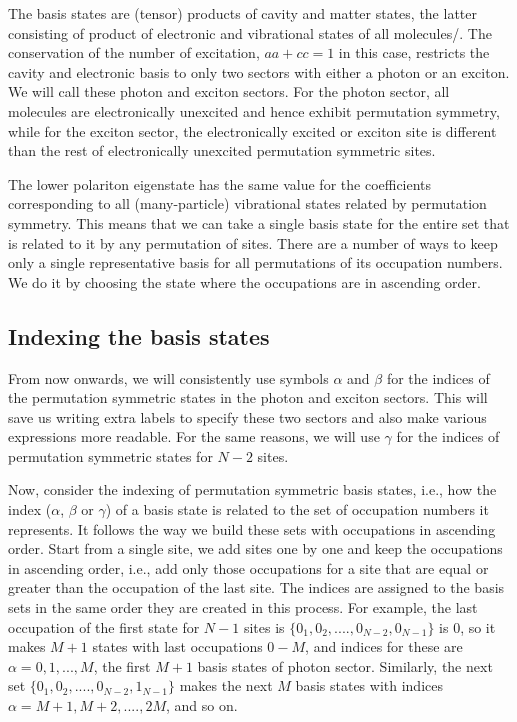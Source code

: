 \documentclass[final,twocolumn]{elsarticle}
\newcommand{\az}[1]{{\color{magenta}{#1}}}
\begin{document}
\begin{small}
The basis states are (tensor) products of cavity and matter states, the latter consisting of product of electronic and vibrational states of all molecules/\az{sites}. 
The conservation of the number of excitation,
$aa+cc=1$ in this case,
restricts the cavity and electronic basis to only two sectors with either a photon or an exciton. 
We will call these photon and exciton sectors.
For the photon sector, all molecules are electronically unexcited and hence exhibit permutation symmetry,
while for the exciton sector, the electronically excited or exciton site is different 
than the rest of electronically unexcited permutation symmetric sites.

The lower polariton eigenstate has the same value for the coefficients corresponding to all (many-particle) vibrational states related by permutation symmetry.
This means that we can take a single basis state for the entire set that is related to it by any permutation of sites.
There are a number of ways to keep only a single representative basis for all permutations of its occupation numbers.
We do it by
choosing the state where the occupations are in ascending order.
\subsection{Indexing the basis states}
From now onwards, 
we will consistently use symbols $\alpha$ and $\beta$ for the indices of the permutation symmetric states in the photon and exciton sectors. This will save us writing extra labels to specify these two sectors and also make various expressions more readable. 
For the same reasons, we will use $\gamma$ for the indices of permutation symmetric states for $N-2$ sites.

Now, consider the indexing of permutation symmetric basis states, i.e., how the index ($\alpha$, $\beta$ or $\gamma$) of a basis state is related to the set of occupation numbers it represents.
It follows the way we build these sets with occupations in ascending order.
Start from a single site, we add sites one by one and keep the occupations in ascending order, i.e., add only those occupations for a site that are equal or greater than the
occupation of the last site. 
The indices are assigned to the basis sets in the same order they are created in this process. 
For example, the last occupation of the first state for $N-1$ sites
is $\{0_1,0_2,....,0_{N-2},0_{N-1}\}$ is $0$, so it makes
$M+1$ states with last occupations $0-M$, and indices for these are $\alpha=0,1,...,M$, the first $M+1$ basis states of photon sector.
Similarly, the next set 
$\{0_1,0_2,....,0_{N-2},1_{N-1}\}$ makes the next $M$ basis states with indices $\alpha=M+1,M+2,....,2M$, and so on.




\end{small}
\end{document}
